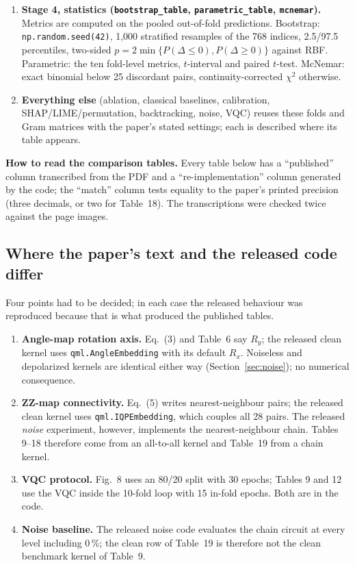 \documentclass[11pt,a4paper]{article}
\newcommand{\code}[1]{\texttt{\small #1}}
\begin{document}
\begin{enumerate}[nosep]
  \item \textbf{Stage 4, statistics (\code{bootstrap\_table}, \code{parametric\_table}, \code{mcnemar}).} Metrics are computed on the pooled out-of-fold predictions. Bootstrap: \code{np.random.seed(42)}, 1,000 stratified resamples of the 768 indices, 2.5/97.5 percentiles, two-sided $p=2\min\{P(\Delta\le0),P(\Delta\ge0)\}$ against RBF. Parametric: the ten fold-level metrics, $t$-interval and paired $t$-test. McNemar: exact binomial below 25 discordant pairs, continuity-corrected $\chi^2$ otherwise.
  \item \textbf{Everything else} (ablation, classical baselines, calibration, SHAP/LIME/permutation, backtracking, noise, VQC) reuses these folds and Gram matrices with the paper's stated settings; each is described where its table appears.
\end{enumerate}
\textbf{How to read the comparison tables.} Every table below has a ``published'' column transcribed from the PDF and a ``re-implementation'' column generated by the code; the ``match'' column tests equality to the paper's printed precision (three decimals, or two for Table~18). The transcriptions were checked twice against the page images.

\subsection{Where the paper's text and the released code differ}
\label{sec:papercode}
Four points had to be decided; in each case the released behaviour was reproduced because that is what produced the published tables.
\begin{enumerate}[nosep]
  \item \textbf{Angle-map rotation axis.} Eq.~(3) and Table~6 say $R_y$; the released clean kernel uses \code{qml.AngleEmbedding} with its default $R_x$. Noiseless and depolarized kernels are identical either way (Section~\ref{sec:noise}); no numerical consequence.
  \item \textbf{ZZ-map connectivity.} Eq.~(5) writes nearest-neighbour pairs; the released clean kernel uses \code{qml.IQPEmbedding}, which couples all 28 pairs. The released \emph{noise} experiment, however, implements the nearest-neighbour chain. Tables 9--18 therefore come from an all-to-all kernel and Table~19 from a chain kernel.
  \item \textbf{VQC protocol.} Fig.~8 uses an 80/20 split with 30 epochs; Tables 9 and 12 use the VQC inside the 10-fold loop with 15 in-fold epochs. Both are in the code.
  \item \textbf{Noise baseline.} The released noise code evaluates the chain circuit at every level including 0\,\%; the clean row of Table~19 is therefore not the clean benchmark kernel of Table~9.
\end{enumerate}
\end{document}
